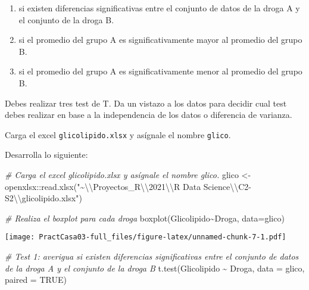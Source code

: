 \documentclass[
]{article}
\newenvironment{Shaded}{}{}
\newcommand{\AttributeTok}[1]{\textcolor[rgb]{0.49,0.56,0.16}{#1}}
\newcommand{\CommentTok}[1]{\textcolor[rgb]{0.38,0.63,0.69}{\textit{#1}}}
\newcommand{\ConstantTok}[1]{\textcolor[rgb]{0.53,0.00,0.00}{#1}}
\newcommand{\FunctionTok}[1]{\textcolor[rgb]{0.02,0.16,0.49}{#1}}
\newcommand{\NormalTok}[1]{#1}
\newcommand{\OtherTok}[1]{\textcolor[rgb]{0.00,0.44,0.13}{#1}}
\newcommand{\SpecialCharTok}[1]{\textcolor[rgb]{0.25,0.44,0.63}{#1}}
\newcommand{\StringTok}[1]{\textcolor[rgb]{0.25,0.44,0.63}{#1}}
\begin{document}
\begin{enumerate}
\def\labelenumi{\arabic{enumi}.}
\item
  si existen diferencias significativas entre el conjunto de datos de la
  droga A y el conjunto de la droga B.
\item
  si el promedio del grupo A es significativamente mayor al promedio del
  grupo B.
\item
  si el promedio del grupo A es significativamente menor al promedio del
  grupo B.
\end{enumerate}

Debes realizar tres test de T. Da un vistazo a los datos para decidir
cual test debes realizar en base a la independencia de los datos o
diferencia de varianza.

Carga el excel \texttt{glicolipido.xlsx} y asígnale el nombre
\texttt{glico}.

Desarrolla lo siguiente:

\begin{Shaded}
\begin{Highlighting}[]
\CommentTok{\# Carga el excel glicolipido.xlsx y asígnale el nombre glico.}
\NormalTok{glico }\OtherTok{\textless{}{-}}\NormalTok{ openxlsx}\SpecialCharTok{::}\FunctionTok{read.xlsx}\NormalTok{(}\StringTok{"\textasciitilde{}}\SpecialCharTok{\textbackslash{}\textbackslash{}}\StringTok{Proyectos\_R}\SpecialCharTok{\textbackslash{}\textbackslash{}}\StringTok{2021}\SpecialCharTok{\textbackslash{}\textbackslash{}}\StringTok{R Data Science}\SpecialCharTok{\textbackslash{}\textbackslash{}}\StringTok{C2{-}S2}\SpecialCharTok{\textbackslash{}\textbackslash{}}\StringTok{glicolipido.xlsx"}\NormalTok{)}

\CommentTok{\# Realiza el boxplot para cada droga}
\FunctionTok{boxplot}\NormalTok{(Glicolipido}\SpecialCharTok{\textasciitilde{}}\NormalTok{Droga, }\AttributeTok{data=}\NormalTok{glico)}
\end{Highlighting}
\end{Shaded}

\texttt{[image: PractCasa03-full\_files/figure-latex/unnamed-chunk-7-1.pdf]}

\begin{Shaded}
\begin{Highlighting}[]
\CommentTok{\# Test 1: averigua si existen diferencias significativas entre el conjunto de datos de la droga A y el conjunto de la droga B}
\FunctionTok{t.test}\NormalTok{(Glicolipido }\SpecialCharTok{\textasciitilde{}}\NormalTok{ Droga, }\AttributeTok{data =}\NormalTok{ glico, }\AttributeTok{paired =} \ConstantTok{TRUE}\NormalTok{)}
\end{Highlighting}
\end{Shaded}
\end{document}
